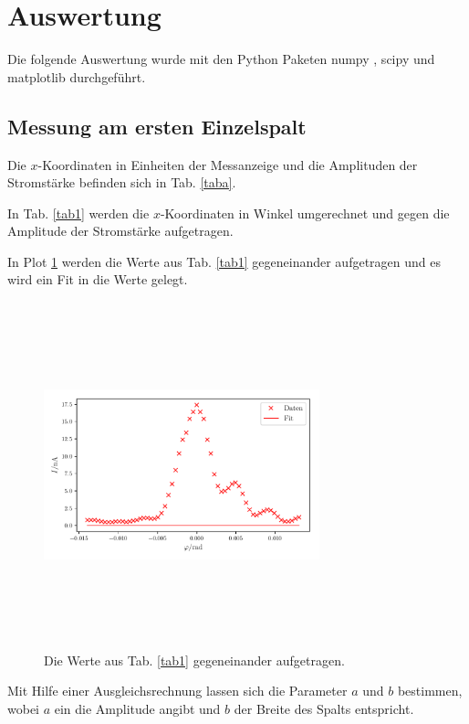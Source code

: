 \section{Auswertung}
\label{sec:Auswertung}
Die folgende Auswertung wurde mit den Python Paketen numpy \cite{numpy}, scipy \cite{scipy} und matplotlib \cite{matplotlib} durchgeführt. 
\subsection{Messung am ersten Einzelspalt}
Die $x$-Koordinaten in Einheiten der Messanzeige und die Amplituden der Stromstärke befinden sich in Tab. \ref{taba}. 



\noindent In Tab. \ref{tab1} werden die $x$-Koordinaten in Winkel umgerechnet und gegen die Amplitude der Stromstärke aufgetragen. 



In Plot \ref{fig:plot1} werden die Werte aus Tab. \ref{tab1} gegeneinander aufgetragen und es wird ein Fit in die Werte gelegt. 

\begin{figure}
    \centering
    \includegraphics[width=8cm, height=10cm]{build/plot1.pdf}
    \caption{Die Werte aus Tab. \ref{tab1} gegeneinander aufgetragen.}
    \label{fig:plot1}
\end{figure}

\noindent Mit Hilfe einer Ausgleichsrechnung lassen sich die Parameter $a$ und $b$ bestimmen, wobei $a$ ein die Amplitude angibt und $b$ der Breite des Spalts entspricht. 

